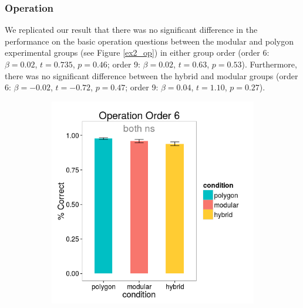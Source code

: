 \documentclass[11pt]{article}
\begin{document}
\subsubsection{Operation}
We replicated our result that there was no significant difference in the performance on the basic operation questions between the modular and polygon experimental groups (see Figure \ref{ex2_op}) in either group order (order 6: $\beta = 0.02$, $t = 0.735$, $p = 0.46$; order 9: $\beta = 0.02$, $t = 0.63$, $p = 0.53$). Furthermore, there was no significant difference between the hybrid and modular groups (order 6: $\beta = -0.02$, $t = -0.72$, $p = 0.47$; order 9: $\beta = 0.04$, $t = 1.10$, $p = 0.27$).
\begin{figure}[H]
\centering
\begin{subfigure}[c]{0.4\textwidth}
\centering
\includegraphics[width=\textwidth]{figures/2/op_6_r.png}
\end{subfigure}
~
\begin{subfigure}[c]{0.4\textwidth}
\centering

\end{subfigure}
\end{figure}
\end{document}
